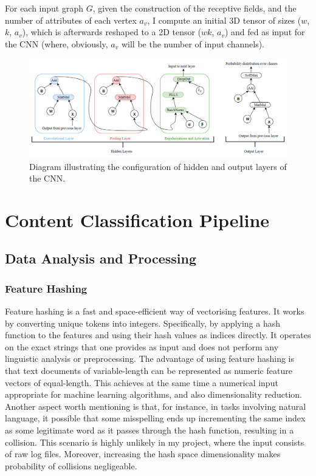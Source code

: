 For each input graph $G$, given the construction of the receptive fields, and the number of attributes of each vertex $a_v$, I compute an initial 3D tensor of sizes ($w$, $k$, $a_v$), which is afterwards reshaped to a 2D tensor ($wk$, $a_v$) and fed as input for the CNN (where, obviously, $a_v$ will be the number of input channels). \\


\begin{figure}[H]
  \centering
  \centerline{\includegraphics[scale=0.6]{Images/cnn_layers.png}}
  \caption{Diagram illustrating the configuration of hidden and output layers of the CNN.}
  \label{cnn_layers}
\end{figure}


\section{Content Classification Pipeline}
\subsection{Data Analysis and Processing}
\subsubsection*{Feature Hashing}

Feature hashing is a fast and space-efficient way of vectorising features. It works by converting unique tokens into integers. Specifically, by applying a hash function to the features and using their hash values as indices directly. It operates on the exact strings that one provides as input and does not perform any linguistic analysis or preprocessing. The advantage of using feature hashing is that text documents of variable-length can be represented as numeric feature vectors of equal-length. This achieves at the same time a numerical input appropriate for machine learning algorithms, and also dimensionality reduction. Another aspect worth mentioning is that, for instance, in tasks involving natural language, it possible that some misspelling ends up incrementing the same index as some legitimate word as it passes through the hash function, resulting in a collision. This scenario is highly unlikely in my project, where the input consists of raw log files. Moreover, increasing the hash space dimensionality makes probability of collisions negligeable.\\

